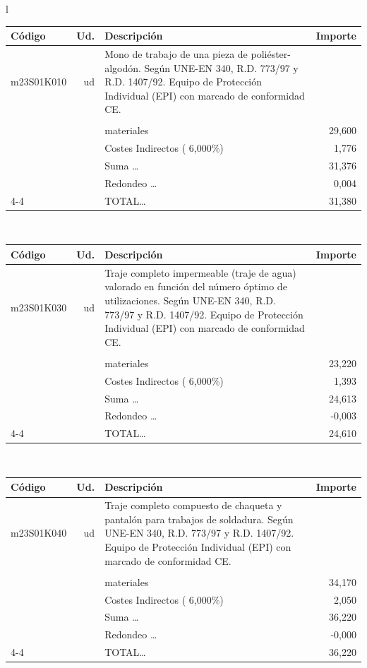 \documentclass{book}%
\begin{document}
\begin{longtable}{l}
\begin{tabular}{l r p{60mm} r}
Código&Ud.&Descripción&Importe\\%
\hline%
m23S01K010&ud&Mono de trabajo de una pieza de poliéster{-}algodón. Según UNE{-}EN 340, R.D. 773/97 y R.D. 1407/92. Equipo de Protección Individual (EPI) con marcado de conformidad CE.&\\%
&&&\\%
&&materiales&    29,600\\%
&&Costes Indirectos (     6,000\%)&     1,776\\%
&&Suma \ldots&    31,376\\%
&&Redondeo \ldots&     0,004\\%
\cline{4-4}%
&&TOTAL\ldots&    31,380\\%
\end{tabular}\\%
\begin{tabular}{l r p{60mm} r}%
Código&Ud.&Descripción&Importe\\%
\hline%
m23S01K030&ud&Traje completo impermeable (traje de agua) valorado en función del número óptimo de utilizaciones. Según UNE{-}EN 340, R.D. 773/97 y R.D. 1407/92. Equipo de Protección Individual (EPI) con marcado de conformidad CE.&\\%
&&&\\%
&&materiales&    23,220\\%
&&Costes Indirectos (     6,000\%)&     1,393\\%
&&Suma \ldots&    24,613\\%
&&Redondeo \ldots&    {-}0,003\\%
\cline{4-4}%
&&TOTAL\ldots&    24,610\\%
\end{tabular}\\%
\begin{tabular}{l r p{60mm} r}%
Código&Ud.&Descripción&Importe\\%
\hline%
m23S01K040&ud&Traje completo compuesto de chaqueta y pantalón para trabajos de soldadura. Según UNE{-}EN 340, R.D. 773/97 y R.D. 1407/92. Equipo de Protección Individual (EPI) con marcado de conformidad CE.&\\%
&&&\\%
&&materiales&    34,170\\%
&&Costes Indirectos (     6,000\%)&     2,050\\%
&&Suma \ldots&    36,220\\%
&&Redondeo \ldots&    {-}0,000\\%
\cline{4-4}%
&&TOTAL\ldots&    36,220\\%

\end{tabular}
\end{longtable}
\end{document}
